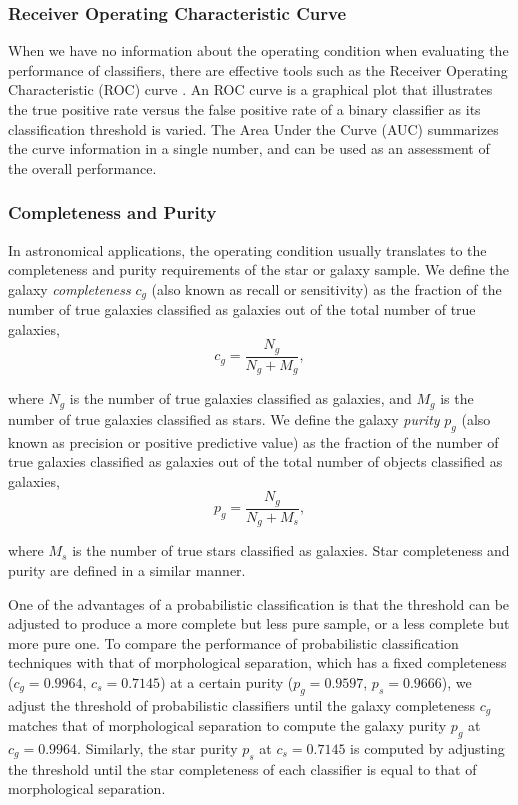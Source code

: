 \subsubsection{Receiver Operating Characteristic Curve}

When we have no information about the operating condition
when evaluating the performance of classifiers,
there are effective tools such as
the Receiver Operating Characteristic (ROC) curve
\citep*{swets2000better}.
An ROC curve is a graphical plot that illustrates the true positive rate
versus the false positive rate of a binary classifier
as its classification threshold is varied.
The Area Under the Curve (AUC) summarizes the curve information
in a single number,
and can be used as an assessment of the overall performance.

\subsubsection{Completeness and Purity}

In astronomical applications,
the operating condition usually translates to
the completeness and purity requirements of the star or galaxy sample.
We define the galaxy \textit{completeness}
$c_g$ (also known as recall or sensitivity) as
the fraction of the number of true galaxies classified as galaxies
out of the total number of true galaxies,
\begin{equation}
c_g = \frac{N_g}{N_g + M_g},
\end{equation}

\noindent
where $N_g$ is the number of true galaxies classified as galaxies,
and $M_g$ is the number of true galaxies classified as stars.
We define the galaxy \textit{purity} $p_g$ (also known as precision
or positive predictive value)
as the fraction of the number of true galaxies classified as galaxies
out of the total number of objects classified as galaxies, 
\begin{equation}
p_g = \frac{N_g}{N_g + M_s},
\end{equation}

\noindent
where $M_s$ is the number of true stars classified as galaxies.
Star completeness and purity are defined in a similar manner.


One of the advantages of a probabilistic classification is
that the threshold can be adjusted to produce
a more complete but less pure sample,
or a less complete but more pure one.
To compare the performance of probabilistic classification techniques
with that of morphological separation,
which has a fixed completeness ($c_g = 0.9964$, $c_s = 0.7145$)
at a certain purity ($p_g = 0.9597$, $p_s = 0.9666$),
we adjust the threshold of probabilistic classifiers
until the galaxy completeness $c_g$ matches
that of morphological separation
to compute the galaxy purity $p_{g}$ at $c_g=0.9964$.
Similarly, the star purity $p_{s}$ at $c_{s}=0.7145$
is computed by adjusting the threshold
until the star completeness of each classifier is equal to
that of morphological separation.


